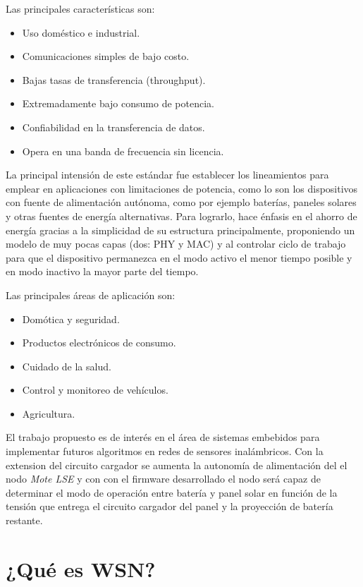 \noindent Las principales características son:
		\begin{itemize}
			\item Uso doméstico e industrial.
			\item Comunicaciones simples de bajo costo. 
			\item Bajas tasas de transferencia (throughput).
			\item Extremadamente bajo consumo de potencia.
			\item Confiabilidad en la transferencia de datos.
			\item Opera en una banda de frecuencia sin licencia.
		\end{itemize}

La principal intensión de este estándar fue establecer los lineamientos para emplear en aplicaciones con limitaciones de potencia, como lo son los dispositivos con fuente de alimentación autónoma, como por ejemplo baterías, paneles solares y otras fuentes de energía alternativas. Para lograrlo, hace énfasis en el ahorro de energía gracias a la simplicidad de su estructura principalmente, proponiendo un modelo de muy pocas capas (dos: PHY y MAC) y al controlar ciclo de trabajo para que el dispositivo permanezca en el modo activo el menor tiempo posible y en modo inactivo la mayor parte del tiempo.

\noindent Las principales áreas de aplicación son:
		\begin{itemize}
			\item Domótica y seguridad.
			\item Productos electrónicos de consumo.
			\item Cuidado de la salud.
			\item Control y monitoreo de vehículos.
			\item Agricultura.
		\end{itemize}

El trabajo propuesto es de interés en el área de sistemas embebidos para implementar futuros algoritmos en redes de sensores inalámbricos. Con la extension del circuito cargador se aumenta la autonomía de alimentación del el nodo \textit{Mote LSE} y con con el firmware desarrollado el nodo será capaz de determinar el modo de operación entre batería y panel solar en función de la tensión que entrega el circuito cargador del panel y la proyección de batería restante.

\section{¿Qué es WSN?}
\label{sec:wsn}

